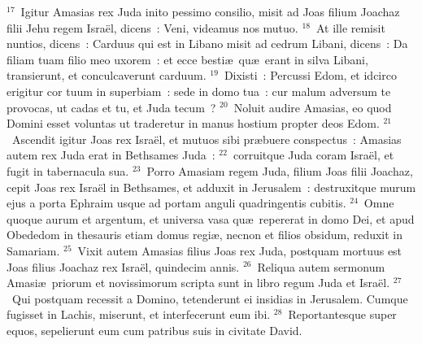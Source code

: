 ${}^{17}$~Igitur Amasias rex Juda inito pessimo consilio, misit ad Joas filium Joachaz filii Jehu regem Isra\"el, dicens~: Veni, videamus nos mutuo.
${}^{18}$~At ille remisit nuntios, dicens~: Carduus qui est in Libano misit ad cedrum Libani, dicens~: Da filiam tuam filio meo uxorem~: et ecce besti\ae\ qu\ae\ erant in silva Libani, transierunt, et conculcaverunt carduum.
${}^{19}$~Dixisti~: Percussi Edom, et idcirco erigitur cor tuum in superbiam~: sede in domo tua~: cur malum adversum te provocas, ut cadas et tu, et Juda tecum~?
${}^{20}$~Noluit audire Amasias, eo quod Domini esset voluntas ut traderetur in manus hostium propter deos Edom.
${}^{21}$~Ascendit igitur Joas rex Isra\"el, et mutuos sibi pr\ae buere conspectus~: Amasias autem rex Juda erat in Bethsames Juda~:
${}^{22}$~corruitque Juda coram Isra\"el, et fugit in tabernacula sua.
${}^{23}$~Porro Amasiam regem Juda, filium Joas filii Joachaz, cepit Joas rex Isra\"el in Bethsames, et adduxit in Jerusalem~: destruxitque murum ejus a porta Ephraim usque ad portam anguli quadringentis cubitis.
${}^{24}$~Omne quoque aurum et argentum, et universa vasa qu\ae\ repererat in domo Dei, et apud Obededom in thesauris etiam domus regi\ae , necnon et filios obsidum, reduxit in Samariam.
${}^{25}$~Vixit autem Amasias filius Joas rex Juda, postquam mortuus est Joas filius Joachaz rex Isra\"el, quindecim annis.
${}^{26}$~Reliqua autem sermonum Amasi\ae\ priorum et novissimorum scripta sunt in libro regum Juda et Isra\"el.
${}^{27}$~Qui postquam recessit a Domino, tetenderunt ei insidias in Jerusalem. Cumque fugisset in Lachis, miserunt, et interfecerunt eum ibi.
${}^{28}$~Reportantesque super equos, sepelierunt eum cum patribus suis in civitate David.

